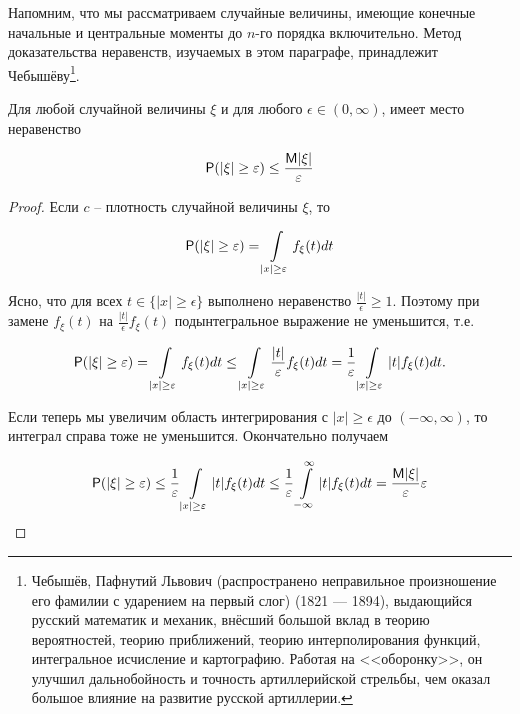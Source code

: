 Напомним, что мы рассматриваем случайные величины, имеющие конечные начальные и центральные моменты до $n$-го порядка включительно.
Метод доказательства неравенств, изучаемых в этом параграфе, принадлежит Чебышёву\footnote{
Чебышёв, Пафнутий Львович (распространено неправильное произношение его фамилии с ударением на первый слог) (1821 — 1894), выдающийся русский математик и механик, внёсший большой вклад
в теорию вероятностей, теорию приближений, теорию интерполирования функций, интегральное исчисление и картографию. Работая на <<оборонку>>, он улучшил дальнобойность и точность артиллерийской
стрельбы, чем оказал большое влияние на развитие русской артиллерии.	
}.

\begin{theorem}

 Для любой случайной
величины $\xi$ и для любого $\epsilon \in (0, \infty)$, имеет место неравенство

\begin{equation*}
\P( |\xi| \geq \epsilon ) \leq \frac{\M|\xi|}{\epsilon}	
\end{equation*}	
\end{theorem}

\begin{proof}
	Если $c$ -- плотность случайной величины $\xi$, то

\begin{equation*}
	\P( |\xi| \geq \epsilon ) = \int\limits_{|x|\geq \epsilon} f_{\xi}(t)dt
\end{equation*}

Ясно, что для всех $t \in \{ |x| \geq \epsilon \}$ выполнено неравенство $\frac{|t|}{\epsilon} \geq 1$. Поэтому при замене $f_{\xi}(t)$ на $\frac{|t|}{\epsilon} f_{\xi}(t)$ подынтегральное выражение не уменьшится, т.е.

\begin{equation*}
\P( |\xi| \geq \epsilon ) = \int\limits_{|x| \geq \epsilon}f_{\xi}(t)dt \leq \int\limits_{|x| \geq \epsilon} \frac{|t|}{\epsilon} f_{\xi}(t)dt = \frac{1}{\epsilon}\int\limits_{|x| \geq \epsilon} |t|f_{\xi}(t)dt. 
\end{equation*}

Если теперь мы увеличим область интегрирования с ${ |x| \geq \epsilon }$ до $(−\infty, \infty)$,
то интеграл справа тоже не уменьшится. Окончательно получаем

\begin{equation*}
	\P( |\xi| \geq \epsilon ) \leq \frac{1}{\epsilon} \int\limits_{|x| \geq \epsilon} |t|f_{\xi}(t)dt \leq \frac{1}{\epsilon} \int\limits_{-\infty}^{\infty} |t|f_{\xi}(t)dt = \frac{\M|\xi|}{\epsilon}
\epsilon
\end{equation*}
\end{proof}


